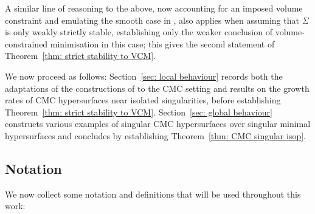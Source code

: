 \documentclass[12pt]{article}
\begin{document}
\bigskip

A similar line of reasoning to the above, now accounting for an imposed volume constraint and emulating the smooth case in \cite{G96}, also applies when assuming that $\Sigma$ is only weakly strictly stable, establishing only the weaker conclusion of volume-constrained minimisation in this case; this gives the second statement of Theorem~\ref{thm: strict stability to VCM}.

\bigskip

We now proceed as follows: Section~\ref{sec: local behaviour} records both the adaptations of the constructions of \cite{CHS84} to the CMC setting and results on the growth rates of CMC hypersurfaces near isolated singularities, before establishing Theorem~\ref{thm: strict stability to VCM}. Section~\ref{sec: global behaviour} constructs various examples of singular CMC hypersurfaces over singular minimal hypersurfaces and concludes by establishing Theorem~\ref{thm: CMC singular isop}.


\subsection{Notation}\label{subsec: notation}

We now collect some notation and definitions that will be used throughout this work:
\end{document}
